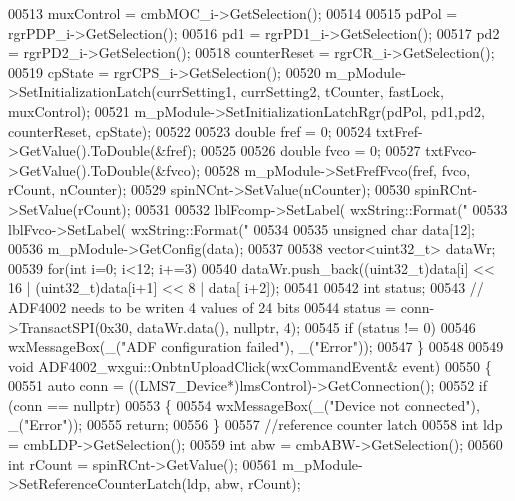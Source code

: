 \begin{DoxyCode}
{00513     muxControl = cmbMOC\_i->GetSelection();
00514 
00515     pdPol = rgrPDP\_i->GetSelection();
00516     pd1 = rgrPD1\_i->GetSelection();
00517     pd2 = rgrPD2\_i->GetSelection();
00518     counterReset = rgrCR\_i->GetSelection();
00519     cpState = rgrCPS\_i->GetSelection();
00520     m\_pModule->SetInitializationLatch(currSetting1, currSetting2, tCounter, fastLock, muxControl);
00521     m\_pModule->SetInitializationLatchRgr(pdPol, pd1,pd2, counterReset, cpState);
00522 
00523     \textcolor{keywordtype}{double} fref = 0;
00524     txtFref->GetValue().ToDouble(&fref);
00525 
00526     \textcolor{keywordtype}{double} fvco = 0;
00527     txtFvco->GetValue().ToDouble(&fvco);
00528     m\_pModule->SetFrefFvco(fref, fvco, rCount, nCounter);
00529     spinNCnt->SetValue(nCounter);
00530     spinRCnt->SetValue(rCount);
00531 
00532     lblFcomp->SetLabel( wxString::Format(\textcolor{stringliteral}{"%
00533     lblFvco->SetLabel( wxString::Format(\textcolor{stringliteral}{"%
00534 
00535     \textcolor{keywordtype}{unsigned} \textcolor{keywordtype}{char} data[12];
00536     m\_pModule->GetConfig(data);
00537 
00538     vector<uint32\_t> dataWr;
00539     \textcolor{keywordflow}{for}(\textcolor{keywordtype}{int} i=0; i<12; i+=3)
00540         dataWr.push\_back((uint32\_t)data[i] << 16 | (uint32\_t)data[i+1] << 8 | data[
      i+2]);
00541 
00542     \textcolor{keywordtype}{int} status;
00543 \textcolor{comment}{// ADF4002 needs to be writen 4 values of 24 bits}
00544     status = conn->TransactSPI(0x30, dataWr.data(), \textcolor{keyword}{nullptr}, 4);
00545     \textcolor{keywordflow}{if} (status != 0)
00546         wxMessageBox(\_(\textcolor{stringliteral}{"ADF configuration failed"}), \_(\textcolor{stringliteral}{"Error"}));
00547 \}
00548 
00549 \textcolor{keywordtype}{void} ADF4002_wxgui::OnbtnUploadClick(wxCommandEvent& event)
00550 \{
00551     \textcolor{keyword}{auto} conn =  ((LMS7_Device*)lmsControl)->GetConnection();
00552     \textcolor{keywordflow}{if} (conn == \textcolor{keyword}{nullptr})
00553     \{
00554         wxMessageBox(\_(\textcolor{stringliteral}{"Device not connected"}), \_(\textcolor{stringliteral}{"Error"}));
00555         \textcolor{keywordflow}{return};
00556     \}
00557  \textcolor{comment}{//reference counter latch}
00558     \textcolor{keywordtype}{int} ldp = cmbLDP->GetSelection();
00559     \textcolor{keywordtype}{int} abw = cmbABW->GetSelection();
00560     \textcolor{keywordtype}{int} rCount = spinRCnt->GetValue();
00561     m\_pModule->SetReferenceCounterLatch(ldp, abw, rCount);
}}}
\end{DoxyCode}
